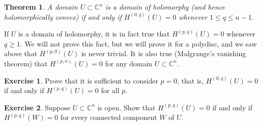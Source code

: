 \documentclass[12pt,openany]{book}
\newcommand{\C}{{\mathbb{C}}}
\theoremstyle{plain}
\newtheorem{thm}{Theorem}[section]
\theoremstyle{remark}
\theoremstyle{definition}
\newenvironment{exbox}{%
    \def\FrameCommand{\vrule width 1pt \relax\hspace{10pt}}%
    \MakeFramed{\advance\hsize-\width\FrameRestore}%
}{%
    \endMakeFramed
}
\theoremstyle{exercise}
\newtheorem{exercise}{Exercise}[section]
\theoremstyle{example}
\begin{document}
\begin{thm}
A domain $U \subset \C^n$ is a domain of holomorphy
(and hence holomorphically convex) if and only if $H^{(0,q)}(U) = 0$
whenever $1 \leq q \leq n-1$.
\end{thm}

If $U$ is a domain of holomorphy, it is in fact true that $H^{(p,q)}(U) = 0$
whenever $q \geq 1$.  We will not prove this fact, but we will prove it for a
polydisc, and we saw above that $H^{(p,0)}(U)$ is never trivial.
It is also true (Malgrange's vanishing theorem) that $H^{(p,n)}(U) = 0$
for any domain $U \subset \C^n$.

\begin{exbox}
\begin{exercise} \label{exercise:zeropsufficient}
Prove that
it is sufficient to consider $p=0$,
that is,
$H^{(0,q)}(U) = 0$ if and only if $H^{(p,q)}(U) = 0$ for all $p$.
\end{exercise}

\begin{exercise} \label{exercise:dolbeaultdisconnected}
Suppose $U \subset \C^n$ is open.
Show that
$H^{(p,q)}(U) = 0$ if and only if $H^{(p,q)}(W) = 0$ for
every connected component $W$ of $U$.
\end{exercise}
\end{exbox}
\end{document}
